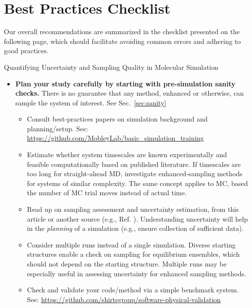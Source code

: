 \section{Best Practices Checklist}

Our overall recommendations are summarized in the checklist  presented on the following page, which should facilitate avoiding common errors and adhering to good practices.

\begin{Checklists*}[p!]
\begin{checklist}{Quantifying Uncertainty and Sampling Quality in Molecular Simulation}
\begin{itemize}
\item
  \textbf{Plan your study carefully by starting with pre-simulation sanity checks.}
  There is no guarantee that any method, enhanced or otherwise, can sample the system of interest.
  See Sec.\ \ref{sec:sanity}
    \begin{itemize}
    \item Consult best-practices papers on simulation background and planning/setup.
      See: \url{https://github.com/MobleyLab/basic_simulation_training}
    \item Estimate whether system timescales are known experimentally and feasible computationally based on published literature.
      If timescales are too long for straight-ahead MD, investigate enhanced-sampling methods for systems of similar complexity.
      The same concept applies to MC, based the number of MC trial moves instead of actual time.
    \item Read up on sampling assessment and uncertainty estimation, from this article or another source (e.g., Ref. \cite{Grossfield2009}).
      Understanding uncertainty will help in the \emph{planning} of a simulation (e.g., ensure collection of sufficient data).
    \item Consider multiple runs instead of a single simulation.
      Diverse starting structures enable a check on sampling for equilibrium ensembles, which should not depend on the starting structure.
      Multiple runs may be especially useful in assessing uncertainty for enhanced sampling methods.
    \item Check and validate your code/method via a simple benchmark system.
      See: \url{https://github.com/shirtsgroup/software-physical-validation}
    \end{itemize}
    \vspace{-0.325\baselineskip} %
    

\end{itemize}
\end{checklist}
\end{Checklists*}
